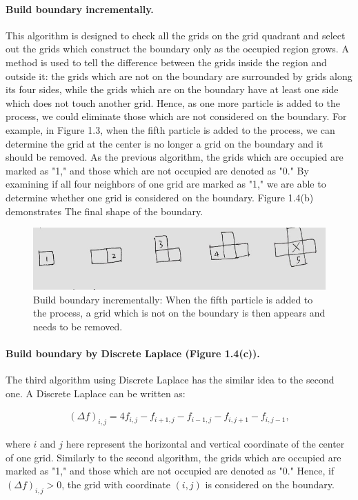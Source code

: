 \documentclass[letterpaper]{article}
\numberwithin{equation}{section} %
\numberwithin{figure}{section} %
\numberwithin{table}{section} %
\begin{document}
\paragraph{Build boundary incrementally.} 
This algorithm is designed to check all the grids on the grid quadrant and select out the grids which construct the boundary only as the occupied region grows. A method is used to tell the difference between the grids inside the region and outside it: the grids which are not on the boundary are surrounded by grids along its four sides, while the grids which are on the boundary have at least one side which does not touch another grid. Hence, as one more particle is added to the process, we could eliminate those which are not considered on the boundary. For example, in Figure 1.3, when the fifth particle is added to the process, we can determine the grid at the center is no longer a grid on the boundary and it should be removed. As the previous algorithm, the grids which are occupied are marked as "1," and those which are not occupied are denoted as "0." By examining if all four neighbors of one grid are marked as "1," we are able to determine whether one grid is considered on the boundary. Figure 1.4(b) demonstrates The final shape of the boundary.

\begin{figure}[h]
		\centering
		\includegraphics[width=0.7\linewidth]{bdryAlg2}
		\caption{Build boundary incrementally: When the fifth particle is added to the process, a grid which is not on the boundary is then appears and needs to be removed.}
		\label{fig:bdryAlg2}
\end{figure}

\paragraph{Build boundary by Discrete Laplace (Figure 1.4(c)).}
The third algorithm using Discrete Laplace has the similar idea to the second one. A Discrete Laplace can be written as:

\begin{align} 
(\Delta f)_{i,j} = 4f_{i,j}-f_{i+1,j}- f_{i-1,j}-f_{i,j+1}-f_{i,j-1},
\end{align}

\noindent
where $i$ and $j$ here represent the horizontal and vertical coordinate of the center of one grid. Similarly to the second algorithm, the grids which are occupied are marked as "1," and those which are not occupied are denoted as "0." Hence, if $(\Delta f)_{i,j}>0$, the grid with coordinate $(i,j)$ is considered on the boundary. 
\end{document}

